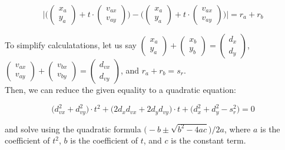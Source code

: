 \begin{equation}
\Bigg | \bigg ( \begin{pmatrix}x_{a} \\ y_{a}\end{pmatrix} + t \cdot
  \begin{pmatrix}v_{ax} \\ v_{ay}\end{pmatrix} \bigg ) - \bigg (
  \begin{pmatrix}x_{a} \\ y_{a}\end{pmatrix} + t \cdot
  \begin{pmatrix}v_{ax} \\ v_{ay}\end{pmatrix} \bigg ) \Bigg |
  =  r_{a} + r_{b}
\end{equation}

To simplify calculatations, let us say
$\begin{pmatrix}x_{a} \\ y_{a}\end{pmatrix} +
\begin{pmatrix}x_{b} \\ y_{b}\end{pmatrix} =
\begin{pmatrix}d_{x} \\ d_{y} \end{pmatrix}$,
$\begin{pmatrix}v_{ax} \\ v_{ay}\end{pmatrix} +
\begin{pmatrix}v_{bx} \\ v_{by}\end{pmatrix} =
\begin{pmatrix}d_{vx} \\ d_{vy}\end{pmatrix}$, and
$r_{a} + r_{b} = s_{r}$.\\

Then, we can reduce the given equality to a quadratic equation:

\begin{equation}
  \big ( d_{vx}^{2} + d_{vy}^{2} \big ) \cdot t^{2} +
  \big ( 2 d_{x} d_{vx} + 2 d_{y} d_{vy} \big ) \cdot t +
  \big ( d_{x}^{2} + d_{y}^{2} - s_{r}^{2} \big ) = 0
\end{equation}

and solve using the quadratic formula
${\big ( -b \pm \sqrt{b^{2} - 4ac} \big ) } / {2a}$, where
$a$ is the coefficient of $t^2$, $b$ is the coefficient of $t$, and $c$ is the
constant term.\\


